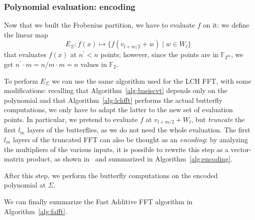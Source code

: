     \subsubsection{Polynomial evaluation: encoding}
        Now that we built the Frobenius partition, we have to evaluate $f$ on it: we define the linear map
        \begin{equation}
            E_\Sigma : f(x) \mapsto \{f(v_{l+m/2} + w) \mid w \in W_l\}
        \end{equation}
        that evaluates $f(x)$ at $n^\prime < n$ points; however, since the points are in $\mathds{F}_{2^m}$, we
        get $n^\prime \cdot m = n/m\cdot m = n$ values in $\mathds{F}_2$. 

        To perform $E_\Sigma$ we can use the same algorithm used for the LCH FFT, with some modifications:
        recalling that Algorithm~\ref{alg:basiscvt} depends only on the polynomial and that Algorithm~\ref{alg:lchfft} 
        performs the actual butterfly computations, we only have to adapt the latter to the new set of evaluation points.
        In particular, we pretend to evaluate $f$ at $v_{l+m/2} + W_l$, but \emph{truncate} the first $l_m$ layers of
        the butterflies, as we do not need the whole evaluation. The first $l_m$ layers of the truncated FFT can also be thought 
        as an \textit{encoding}: by analyzing the multipliers of the various inputs, it is possible to rewrite this step as 
        a vector-matrix product, as shown in~\cite{chen2018multiplying} and summarized in Algorithm~\ref{alg:encoding}.

    \begin{algorithm2e}[H]
        \caption{Encode}
        \label{alg:encoding}
        
    \end{algorithm2e}

    After this step, we perform the butterfly computations on the encoded polynomial at $\Sigma$.

    We can finally summarize the Fast Additive FFT algorithm in Algorithm~\ref{alg:fafft}.


